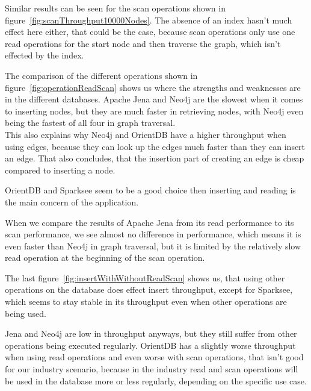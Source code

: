 Similar results can be seen for the scan operations shown in figure~\ref{fig:scanThroughput10000Nodes}.
The absence of an index hasn't much effect here either,
that could be the case,
because scan operations only use one read operations for the start node and then traverse the graph,
which isn't effected by the index.

The comparison of the different operations shown in figure~\ref{fig:operationReadScan} shows us where the strengths and weaknesses are in the different databases.
Apache Jena and Neo4j are the slowest when it comes to inserting nodes,
but they are much faster in retrieving nodes,
with Neo4j even being the fastest of all four in graph traversal.\\
This also explains why Neo4j and OrientDB have a higher throughput when using edges,
because they can look up the edges much faster than they can insert an edge.
That also concludes,
that the insertion part of creating an edge is cheap compared to inserting a node.

OrientDB and Sparksee seem to be a good choice then inserting and reading is the main concern of the application.

When we compare the results of Apache Jena from its read performance to its scan performance,
we see almost no difference in performance,
which means it is even faster than Neo4j in graph traversal,
but it is limited by the relatively slow read operation at the beginning of the scan operation.

The last figure~\ref{fig:insertWithWithoutReadScan} shows us,
that using other operations on the database does effect insert throughput,
except for Sparksee,
which seems to stay stable in its throughput even when other operations are being used.

Jena and Neo4j are low in throughput anyways,
but they still suffer from other operations being executed regularly.
OrientDB has a slightly worse throughput when using read operations and even worse with scan operations,
that isn't good for our industry scenario,
because in the industry read and scan operations will be used in the database more or less regularly,
depending on the specific use case.

